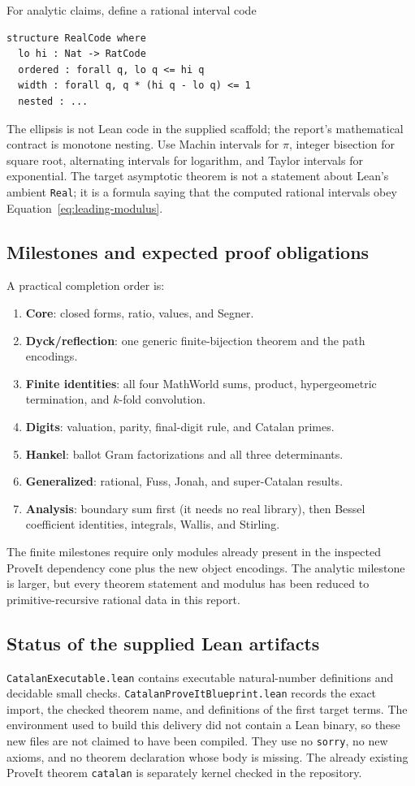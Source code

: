For analytic claims, define a rational interval code
\begin{lstlisting}[language={}]
structure RealCode where
  lo hi : Nat -> RatCode
  ordered : forall q, lo q <= hi q
  width : forall q, q * (hi q - lo q) <= 1
  nested : ...
\end{lstlisting}
The ellipsis is not Lean code in the supplied scaffold; the report's
mathematical contract is monotone nesting.  Use Machin intervals for $\pi$,
integer bisection for square root, alternating intervals for logarithm, and
Taylor intervals for exponential.  The target asymptotic theorem is not a
statement about Lean's ambient \texttt{Real}; it is a formula saying that the
computed rational intervals obey Equation~\eqref{eq:leading-modulus}.

\subsection{Milestones and expected proof obligations}

A practical completion order is:
\begin{enumerate}[leftmargin=2em]
\item \textbf{Core}: closed forms, ratio, values, and Segner.
\item \textbf{Dyck/reflection}: one generic finite-bijection theorem and the
      path encodings.
\item \textbf{Finite identities}: all four MathWorld sums, product,
      hypergeometric termination, and $k$-fold convolution.
\item \textbf{Digits}: valuation, parity, final-digit rule, and Catalan primes.
\item \textbf{Hankel}: ballot Gram factorizations and all three determinants.
\item \textbf{Generalized}: rational, Fuss, Jonah, and super-Catalan results.
\item \textbf{Analysis}: boundary sum first (it needs no real library), then
      Bessel coefficient identities, integrals, Wallis, and Stirling.
\end{enumerate}

The finite milestones require only modules already present in the inspected
ProveIt dependency cone plus the new object encodings.  The analytic milestone
is larger, but every theorem statement and modulus has been reduced to
primitive-recursive rational data in this report.

\subsection{Status of the supplied Lean artifacts}

\texttt{CatalanExecutable.lean} contains executable natural-number definitions
and decidable small checks.  \texttt{CatalanProveItBlueprint.lean} records the
exact import, the checked theorem name, and definitions of the first target
terms.  The environment used to build this delivery did not contain a Lean
binary, so these new files are not claimed to have been compiled.  They use no
\texttt{sorry}, no new axioms, and no theorem declaration whose body is
missing.  The already existing ProveIt theorem \texttt{catalan} is separately
kernel checked in the repository.
